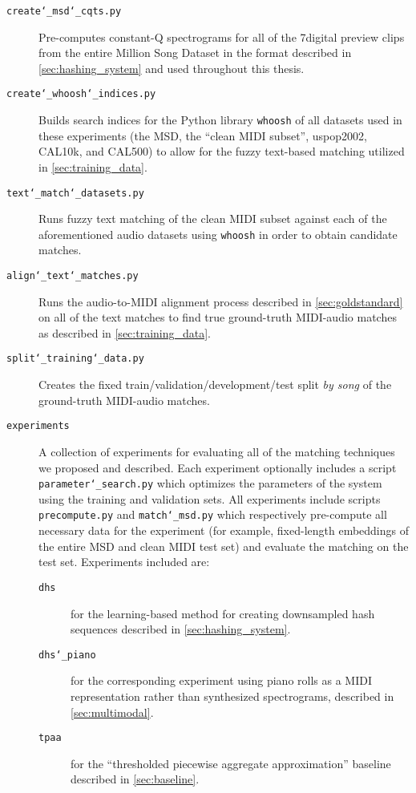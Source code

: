 \begin{description}
\item[\texttt{create\char`_msd\char`_cqts.py}] Pre-computes constant-Q spectrograms for all of the 7digital preview clips \cite{schindler2012facilitating} from the entire Million Song Dataset \cite{bertin2011million} in the format described in \cref{sec:hashing_system} and used throughout this thesis.
\item[\texttt{create\char`_whoosh\char`_indices.py}] Builds search indices for the Python library \texttt{whoosh} of all datasets used in these experiments (the MSD, the ``clean MIDI subset'', uspop2002, CAL10k, and CAL500) to allow for the fuzzy text-based matching utilized in \cref{sec:training_data}.
\item[\texttt{text\char`_match\char`_datasets.py}] Runs fuzzy text matching of the clean MIDI subset against each of the aforementioned audio datasets using \texttt{whoosh} in order to obtain candidate matches.
\item[\texttt{align\char`_text\char`_matches.py}] Runs the audio-to-MIDI alignment process described in \cref{sec:goldstandard} on all of the text matches to find true ground-truth MIDI-audio matches as described in \cref{sec:training_data}.
\item[\texttt{split\char`_training\char`_data.py}] Creates the fixed train/validation/development/test split {\em by song} of the ground-truth MIDI-audio matches.
\item[\texttt{experiments}] A collection of experiments for evaluating all of the matching techniques we proposed and described.
Each experiment optionally includes a script \texttt{parameter\char`_search.py} which optimizes the parameters of the system using the training and validation sets.
All experiments include scripts \texttt{precompute.py} and \texttt{match\char`_msd.py} which respectively pre-compute all necessary data for the experiment (for example, fixed-length embeddings of the entire MSD and clean MIDI test set) and evaluate the matching on the test set.
Experiments included are:
\begin{description}
\item[\texttt{dhs}] for the learning-based method for creating downsampled hash sequences described in \cref{sec:hashing_system}.
\item[\texttt{dhs\char`_piano}] for the corresponding experiment using piano rolls as a MIDI representation rather than synthesized spectrograms, described in \cref{sec:multimodal}.
\item[\texttt{tpaa}] for the ``thresholded piecewise aggregate approximation'' baseline described in \cref{sec:baseline}.

\end{description}
\end{description}
